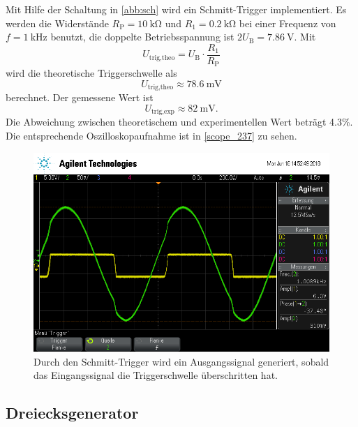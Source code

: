 Mit Hilfe der Schaltung in \autoref{abb:sch} wird ein Schmitt-Trigger implementiert. Es werden die Widerstände $R_\text{P} = \SI{10}{\kilo\ohm}$ und $R_\text{1} = \SI{0.2}{\kilo\ohm}$ bei einer Frequenz von $f = \SI{1}{\kilo\hertz}$ benutzt, die doppelte Betriebsspannung ist $2U_\text{B} = \SI{7.86}{\volt}$. Mit
\begin{equation}
	U_\text{trig,theo} = U_\text{B} \cdot \frac{R_1}{R_\text{P}}
\end{equation}
wird die theoretische Triggerschwelle als
\begin{equation*}
	U_\text{trig,theo} \approx \SI{78.6}{\milli\volt}
\end{equation*}
berechnet. Der gemessene Wert ist
\begin{equation*}
	U_\text{trig,exp} \approx \SI{82}{\milli\volt}.
\end{equation*}
Die Abweichung zwischen theoretischem und experimentellen Wert beträgt 4.3\%. Die entsprechende Oszilloskopaufnahme ist in \autoref{scope_237} zu sehen.
\begin{figure}[h]
	\centering
	\includegraphics[width=\textwidth]{usb/scope_237.png}
	\caption{Durch den Schmitt-Trigger wird ein Ausgangssignal generiert, sobald das Eingangssignal die Triggerschwelle überschritten hat.}
	\label{scope_237}
\end{figure}

\FloatBarrier

\subsection{Dreiecksgenerator}

